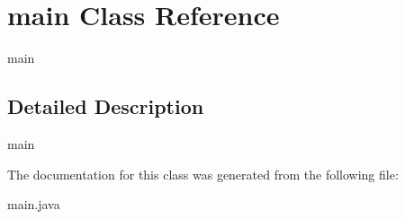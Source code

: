 \hypertarget{classmain}{\section{main Class Reference}
\label{classmain}
}


main  




\subsection{Detailed Description}
main 



The documentation for this class was generated from the following file\-:\begin{DoxyCompactItemize}
\item 
main.\-java\end{DoxyCompactItemize}
